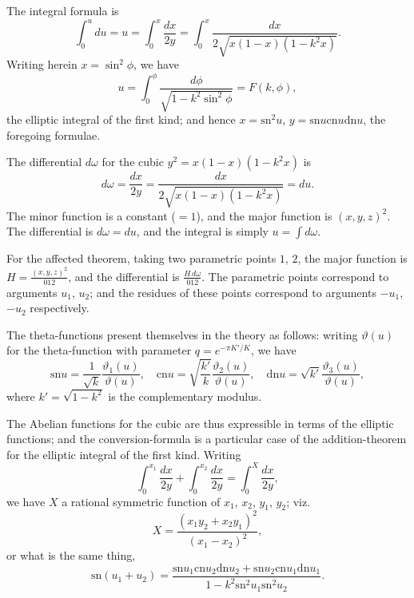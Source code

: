 \documentclass[11pt,a4paper]{book}
\providecommand{\sn}{\mathrm{sn}}
\providecommand{\cn}{\mathrm{cn}}
\providecommand{\dn}{\mathrm{dn}}
\begin{document}
\begin{art}\label{art:122}
The integral formula is
\[
\int_0^u du = u = \int_0^x \frac{dx}{2y} = \int_0^x \frac{dx}{2\sqrt{x(1-x)(1-k^2x)}}.
\]
Writing herein $x = \sin^2\phi$, we have
\[
u = \int_0^\phi \frac{d\phi}{\sqrt{1 - k^2\sin^2\phi}} = F(k, \phi),
\]
the elliptic integral of the first kind; and hence $x = \sn^2 u$, $y = \sn u \cn u \dn u$, the foregoing formulae.
\end{art}

\begin{art}\label{art:123}
The differential $d\omega$ for the cubic $y^2 = x(1-x)(1-k^2x)$ is
\[
d\omega = \frac{dx}{2y} = \frac{dx}{2\sqrt{x(1-x)(1-k^2x)}} = du.
\]
The minor function is a constant ($= 1$), and the major function is $(x, y, z)^2$. The differential is $d\omega = du$, and the integral is simply $u = \int d\omega$.
\end{art}

\newpage
\begin{art}\label{art:124}
For the affected theorem, taking two parametric points $1$, $2$, the major function is $H = \frac{(x, y, z)^2}{012}$, and the differential is $\frac{H\,d\omega}{012}$. The parametric points correspond to arguments $u_1$, $u_2$; and the residues of these points correspond to arguments $-u_1$, $-u_2$ respectively.
\end{art}

\begin{art}\label{art:125}
The theta-functions present themselves in the theory as follows: writing $\vartheta(u)$ for the theta-function with parameter $q = e^{-\pi K'/K}$, we have
\[
\sn u = \frac{1}{\sqrt{k}} \frac{\vartheta_1(u)}{\vartheta(u)}, \quad \cn u = \sqrt{\frac{k'}{k}} \frac{\vartheta_2(u)}{\vartheta(u)}, \quad \dn u = \sqrt{k'} \frac{\vartheta_3(u)}{\vartheta(u)},
\]
where $k' = \sqrt{1 - k^2}$ is the complementary modulus.
\end{art}

\begin{art}\label{art:126}
The Abelian functions for the cubic are thus expressible in terms of the elliptic functions; and the conversion-formula is a particular case of the addition-theorem for the elliptic integral of the first kind. Writing
\[
\int_0^{x_1} \frac{dx}{2y} + \int_0^{x_2} \frac{dx}{2y} = \int_0^X \frac{dx}{2y},
\]
we have $X$ a rational symmetric function of $x_1$, $x_2$, $y_1$, $y_2$; viz.
\[
X = \frac{(x_1 y_2 + x_2 y_1)^2}{(x_1 - x_2)^2},
\]
or what is the same thing,
\[
\sn(u_1 + u_2) = \frac{\sn u_1 \cn u_2 \dn u_2 + \sn u_2 \cn u_1 \dn u_1}{1 - k^2 \sn^2 u_1 \sn^2 u_2}.
\]
\end{art}
\end{document}
